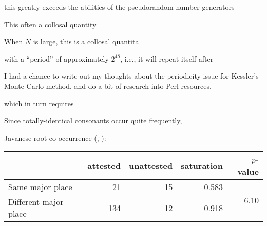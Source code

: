 this greatly exceeds the abilities of the pseudorandom number generators 

This often a collosal quantity 

When $N$ is large, this is a collosal quantita


with a ``period'' of approximately $2 ^ 48$, i.e., it will repeat itself after 




I had a chance to write out my thoughts about the periodicity issue for Kessler's Monte Carlo method, and do a bit of research into Perl resources. 





 which in turn requires

Since totally-identical consonants occur quite frequently, 

\ex Javanese root co-occurrence (\citealp[][264]{Uhlenbeck1950}, \citealp[][139]{Mester1988}): \vspace{6pt} \\
\begin{tabular}{l r r r r}
\toprule
                      & attested & unattested & saturation & $p$-value \\
\midrule
Same major place      & 21       & 15         & 0.583      & \multirow{2}{*}{6.10\e{-06}} \\
Different major place & 134      & 12         & 0.918 \\
\bottomrule
\end{tabular}
\xe

